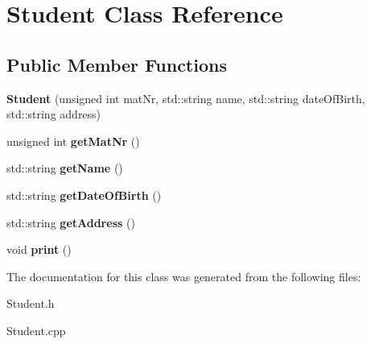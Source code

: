 \hypertarget{class_student}{}\section{Student Class Reference}
\label{class_student}
\subsection*{Public Member Functions}
\begin{DoxyCompactItemize}
\item 
\mbox{\label{class_student_a6c25e4c1ba2564591573597a6c9ecca0}} 
{\bfseries Student} (unsigned int mat\+Nr, std\+::string name, std\+::string date\+Of\+Birth, std\+::string address)
\item 
\mbox{\label{class_student_a2f996798d6c9b904e3abf902f68d3c0b}} 
unsigned int {\bfseries get\+Mat\+Nr} ()
\item 
\mbox{\label{class_student_a729c900a0e95c46f90668f527a72ad34}} 
std\+::string {\bfseries get\+Name} ()
\item 
\mbox{\label{class_student_a9c46502480d94c46865eee494f96bfe0}} 
std\+::string {\bfseries get\+Date\+Of\+Birth} ()
\item 
\mbox{\label{class_student_a960945bd258db14e42973ad04150ebf5}} 
std\+::string {\bfseries get\+Address} ()
\item 
\mbox{\label{class_student_a78e0a36e97d117f12bd1879ca7e5cf9c}} 
void {\bfseries print} ()
\end{DoxyCompactItemize}


The documentation for this class was generated from the following files\+:\begin{DoxyCompactItemize}
\item 
Student.\+h\item 
Student.\+cpp\end{DoxyCompactItemize}
